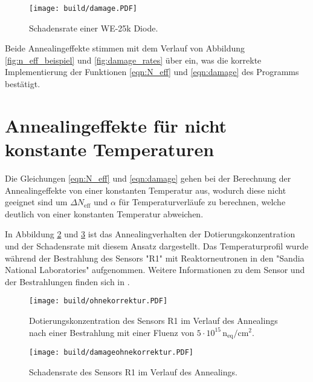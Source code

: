 \begin{figure}
  \centering
    \texttt{[image: build/damage.PDF]}
    \caption{Schadensrate einer WE-25k Diode.}
    \label{fig:damage}
\end{figure}

Beide Annealingeffekte stimmen mit dem Verlauf von Abbildung \ref{fig:n_eff_beispiel} und \ref{fig:damage_rates} über ein, was
die korrekte Implementierung der Funktionen \ref{eqn:N_eff} und \ref{eqn:damage}  des Programms
bestätigt.



\section{Annealingeffekte für nicht konstante Temperaturen}{\label{nicht_konstant}}
Die Gleichungen \ref{eqn:N_eff} und \ref{eqn:damage} gehen bei der Berechnung der Annealingeffekte von
einer konstanten Temperatur aus, wodurch diese nicht geeignet sind um $\Delta N_{\mathrm{eff}}$ und $\alpha$ für
Temperaturverläufe zu berechnen, welche deutlich von einer konstanten Temperatur abweichen.


In Abbildung \ref{fig:N_eff_ohne} und \ref{fig:damage_ohne} ist das Annealingverhalten
der Dotierungskonzentration und der Schadensrate mit
diesem Ansatz dargestellt.
Das Temperaturprofil wurde während der Bestrahlung
des Sensors "R1" mit Reaktorneutronen in den
"Sandia National Laboratories" aufgenommen.
Weitere Informationen zu dem Sensor und
der Bestrahlungen finden sich in \cite{mareike}.

\begin{figure}
  \centering
    \texttt{[image: build/ohnekorrektur.PDF]}
    \caption{Dotierungskonzentration des Sensors R1 im Verlauf des Annealings nach einer Bestrahlung mit einer Fluenz von
    $5\cdot 10^{15} \, \mathrm{n_{eq}/cm^2}$.}
    \label{fig:N_eff_ohne}
\end{figure}

\begin{figure}
  \centering
    \texttt{[image: build/damageohnekorrektur.PDF]}
    \caption{Schadensrate des Sensors R1 im Verlauf des Annealings.}
    \label{fig:damage_ohne}
\end{figure}

